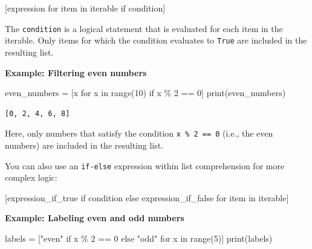 \documentclass[
  letterpaper,
  DIV=11,
  numbers=noendperiod]{scrreprt}
\newenvironment{Shaded}{\begin{snugshade}}{\end{snugshade}}
\newcommand{\BuiltInTok}[1]{\textcolor[rgb]{0.00,0.23,0.31}{#1}}
\newcommand{\ControlFlowTok}[1]{\textcolor[rgb]{0.00,0.23,0.31}{#1}}
\newcommand{\DecValTok}[1]{\textcolor[rgb]{0.68,0.00,0.00}{#1}}
\newcommand{\KeywordTok}[1]{\textcolor[rgb]{0.00,0.23,0.31}{#1}}
\newcommand{\NormalTok}[1]{\textcolor[rgb]{0.00,0.23,0.31}{#1}}
\newcommand{\OperatorTok}[1]{\textcolor[rgb]{0.37,0.37,0.37}{#1}}
\newcommand{\StringTok}[1]{\textcolor[rgb]{0.13,0.47,0.30}{#1}}
\begin{document}
\begin{Shaded}
\begin{Highlighting}[]
\NormalTok{[expression }\ControlFlowTok{for}\NormalTok{ item }\KeywordTok{in}\NormalTok{ iterable }\ControlFlowTok{if}\NormalTok{ condition]}
\end{Highlighting}
\end{Shaded}

The \texttt{condition} is a logical statement that is evaluated for each
item in the iterable. Only items for which the condition evaluates to
\texttt{True} are included in the resulting list.

\textbf{Example: Filtering even numbers}

\begin{Shaded}
\begin{Highlighting}[]
\NormalTok{even\_numbers }\OperatorTok{=}\NormalTok{ [x }\ControlFlowTok{for}\NormalTok{ x }\KeywordTok{in} \BuiltInTok{range}\NormalTok{(}\DecValTok{10}\NormalTok{) }\ControlFlowTok{if}\NormalTok{ x }\OperatorTok{\%} \DecValTok{2} \OperatorTok{==} \DecValTok{0}\NormalTok{]}
\BuiltInTok{print}\NormalTok{(even\_numbers)  }
\end{Highlighting}
\end{Shaded}

\begin{verbatim}
[0, 2, 4, 6, 8]
\end{verbatim}

Here, only numbers that satisfy the condition \texttt{x\ \%\ 2\ ==\ 0}
(i.e., the even numbers) are included in the resulting list.

You can also use an \texttt{if-else} expression within list
comprehension for more complex logic:

\begin{Shaded}
\begin{Highlighting}[]
\NormalTok{[expression\_if\_true }\ControlFlowTok{if}\NormalTok{ condition }\ControlFlowTok{else}\NormalTok{ expression\_if\_false }\ControlFlowTok{for}\NormalTok{ item }\KeywordTok{in}\NormalTok{ iterable]}
\end{Highlighting}
\end{Shaded}

\textbf{Example: Labeling even and odd numbers}

\begin{Shaded}
\begin{Highlighting}[]
\NormalTok{labels }\OperatorTok{=}\NormalTok{ [}\StringTok{"even"} \ControlFlowTok{if}\NormalTok{ x }\OperatorTok{\%} \DecValTok{2} \OperatorTok{==} \DecValTok{0} \ControlFlowTok{else} \StringTok{"odd"} \ControlFlowTok{for}\NormalTok{ x }\KeywordTok{in} \BuiltInTok{range}\NormalTok{(}\DecValTok{5}\NormalTok{)]}
\BuiltInTok{print}\NormalTok{(labels)  }
\end{Highlighting}
\end{Shaded}
\end{document}
